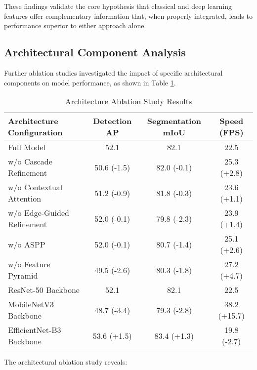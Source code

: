 These findings validate the core hypothesis that classical and deep learning features offer complementary information that, when properly integrated, leads to performance superior to either approach alone.

\subsection{Architectural Component Analysis}
Further ablation studies investigated the impact of specific architectural components on model performance, as shown in Table \ref{tab:architecture_ablation}.

\begin{table}[h]
\centering
\caption{Architecture Ablation Study Results}
\label{tab:architecture_ablation}
\begin{tabular}{lccc}
\hline
\textbf{Architecture Configuration} & \textbf{Detection AP} & \textbf{Segmentation mIoU} & \textbf{Speed (FPS)} \\
\hline
Full Model & 52.1 & 82.1 & 22.5 \\
\hline
w/o Cascade Refinement & 50.6 (-1.5) & 82.0 (-0.1) & 25.3 (+2.8) \\
w/o Contextual Attention & 51.2 (-0.9) & 81.8 (-0.3) & 23.6 (+1.1) \\
w/o Edge-Guided Refinement & 52.0 (-0.1) & 79.8 (-2.3) & 23.9 (+1.4) \\
w/o ASPP & 52.0 (-0.1) & 80.7 (-1.4) & 25.1 (+2.6) \\
w/o Feature Pyramid & 49.5 (-2.6) & 80.3 (-1.8) & 27.2 (+4.7) \\
\hline
ResNet-50 Backbone & 52.1 & 82.1 & 22.5 \\
MobileNetV3 Backbone & 48.7 (-3.4) & 79.3 (-2.8) & 38.2 (+15.7) \\
EfficientNet-B3 Backbone & 53.6 (+1.5) & 83.4 (+1.3) & 19.8 (-2.7) \\
\hline
\end{tabular}
\end{table}

The architectural ablation study reveals:

